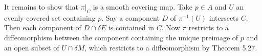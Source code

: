 \documentclass[10pt,letter]{article}
\begin{document}
It remains to show that $\pi \vert_C$ is a smooth covering map. Take $p \in A$ and $U$ an evenly covered set containing $p$. Say a component $D$ of $\pi^{-1}(U)$ intersects $C$. Then each component of $D \cap \delta E$ is contained in $C$. Now $\pi$ restricts to a diffeomorphism between the component containing the unique preimage of $p$ and an open subset of $U \cap \delta M$, which restricts to a diffeomorphism by Theorem 5.27. 
\end{document}
